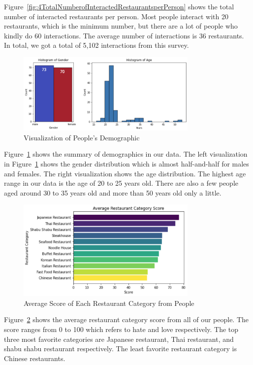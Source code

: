 \documentclass[12pt,oneside,openright,a4paper]{cpe-english-project}
\begin{document}
Figure~\ref{fig:4TotalNumberofInteractedRestaurantsperPerson} shows the total number of interacted restaurants per person. Most people interact with 20 restaurants, which is the minimum number, but there are a lot of people who kindly do 60 interactions. The average number of interactions is 36 restaurants. In total, we got a total of 5,102 interactions from this survey.

\begin{figure}[H]\centering
\includegraphics[width=250pt]{./images/4VisualizationofPeoplesDemographic.png}
\caption{Visualization of People’s Demographic}\label{fig:4VisualizationofPeoplesDemographic}
\end{figure}

Figure~\ref{fig:4VisualizationofPeoplesDemographic} shows the summary of demographics in our data. The left visualization in Figure~\ref{fig:4VisualizationofPeoplesDemographic} shows the gender distribution which is almost half-and-half for males and females. The right visualization shows the age distribution. The highest age range in our data is the age of 20 to 25 years old. There are also a few people aged around 30 to 35 years old and more than 50 years old only a little.

\begin{figure}[H]\centering
\includegraphics[width=250pt]{./images/4AverageScoreofEachRestaurantCategoryfromPeople.png}
\caption{Average Score of Each Restaurant Category from People}\label{fig:4AverageScoreofEachRestaurantCategoryfromPeople}
\end{figure}

Figure~\ref{fig:4AverageScoreofEachRestaurantCategoryfromPeople} shows the average restaurant category score from all of our people. The score ranges from 0 to 100 which refers to hate and love respectively. The top three most favorite categories are Japanese restaurant, Thai restaurant, and shabu shabu restaurant respectively. The least favorite restaurant category is Chinese restaurants.
\end{document}
